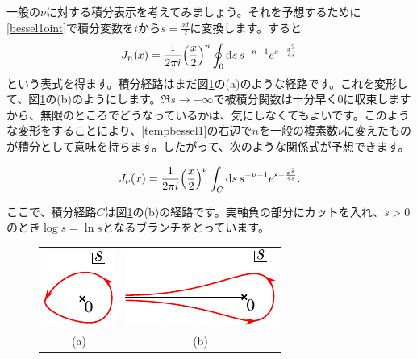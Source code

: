 \documentclass[report,paper=a4, fontsize=12pt, line_length=16cm, number_of_lines=33,dvipdfmx]{jlreq}
\newenvironment{important}{\begin{tcolorbox}[
  colback = white,
  colframe = red!35,
  boxrule = 2mm,
  fonttitle = \bfseries,
  after = \noindent] }{\end{tcolorbox}}
\numberwithin{equation}{section}
\begin{document}
一般の$\nu$に対する積分表示を考えてみましょう。それを予想するために\eqref{bessel1oint}で積分変数を$t$から$s=\frac{xt}{2}$に変換します。すると
\begin{align}
  J_n(x)=\frac{1}{2\pi i}\qty(\frac{x}{2})^{n}\oint_{0}\dd{s}
  s^{-n-1}e^{s-\frac{x^2}{4s}}\label{tempbessel1}
\end{align}
という表式を得ます。積分経路はまだ図\ref{fig:besselcontour}の(a)のような経路です。これを変形して、図\ref{fig:besselcontour}の(b)のようにします。$\Re s\to -\infty$で被積分関数は十分早く$0$に収束しますから、無限のところでどうなっているかは、気にしなくてもよいです。このような変形をすることにより、\eqref{tempbessel1}の右辺で$n$を一般の複素数$\nu$に変えたものが積分として意味を持ちます。したがって、次のような関係式が予想できます。
\begin{important}
  \begin{align}
    J_{\nu}(x)=\frac{1}{2\pi i}\qty(\frac{x}{2})^{\nu}\int_{C}\dd{s}
    s^{-\nu-1}e^{s-\frac{x^2}{4s}}.
    \label{bessel1intnu}
  \end{align}
\end{important}
ここで、積分経路$C$は図\ref{fig:besselcontour}の(b)の経路です。実軸負の部分にカットを入れ、$s>0$のとき$\log s=\ln s$となるブランチをとっています。
\begin{figure}[htbp]
  \centering
  \begin{tabular}{cc}
   \includegraphics[scale=1.5]{contour0.pdf}&\includegraphics[scale=1.5]{ophankel.pdf}\\
   (a) & (b) 
  \end{tabular}
  \caption{}
  \label{fig:besselcontour}
\end{figure}
\end{document}

